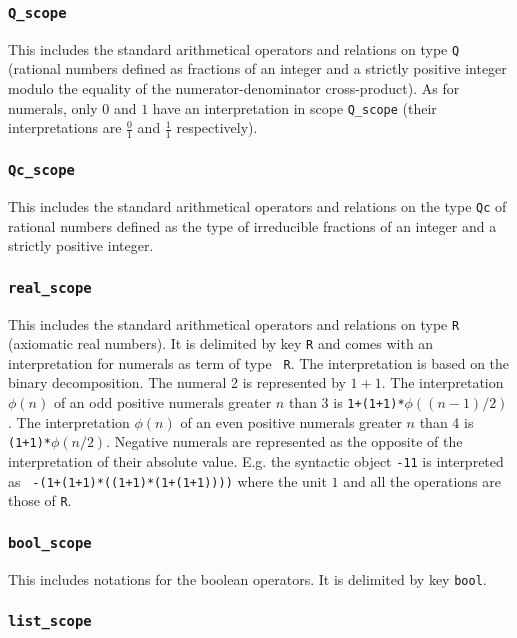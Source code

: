 \subsubsection{\tt Q\_scope}

This includes the standard arithmetical operators and relations on
type {\tt Q} (rational numbers defined as fractions of an integer and
a strictly positive integer modulo the equality of the
numerator-denominator cross-product). As for numerals, only $0$ and
$1$ have an interpretation in scope {\tt Q\_scope} (their
interpretations are $\frac{0}{1}$ and $\frac{1}{1}$ respectively).

\subsubsection{\tt Qc\_scope}

This includes the standard arithmetical operators and relations on the
type {\tt Qc} of rational numbers defined as the type of irreducible
fractions of an integer and a strictly positive integer.

\subsubsection{\tt real\_scope}

This includes the standard arithmetical operators and relations on
type {\tt R} (axiomatic real numbers). It is delimited by key {\tt R}
and comes with an interpretation for numerals as term of type {\tt
R}. The interpretation is based on the binary decomposition.  The
numeral 2 is represented by $1+1$.  The interpretation $\phi(n)$ of an
odd positive numerals greater $n$ than 3 is {\tt 1+(1+1)*$\phi((n-1)/2)$}.
The interpretation $\phi(n)$ of an even positive numerals greater $n$
than 4 is {\tt (1+1)*$\phi(n/2)$}.  Negative numerals are represented as the
opposite of the interpretation of their absolute value. E.g. the
syntactic object {\tt -11} is interpreted as {\tt
-(1+(1+1)*((1+1)*(1+(1+1))))} where the unit $1$ and all the operations are
those of {\tt R}.

\subsubsection{\tt bool\_scope}

This includes notations for the boolean operators. It is
delimited by key {\tt bool}.

\subsubsection{\tt list\_scope}

